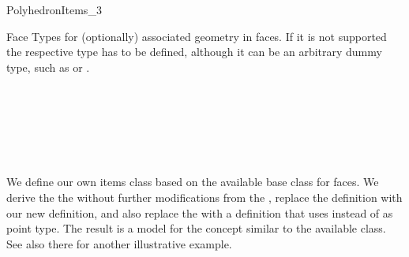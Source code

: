\begin{ccRefConcept}{PolyhedronItems_3}
\begin{ccClass}{Face}
Types for (optionally) associated geometry in faces. If it is not
supported the respective type has to be defined, although it can be
an arbitrary dummy type, such as  or .





\ccTagFullDeclarations
{}
         

\ccGlue
{}


%

\ccTagDefaults

\end{ccClass}

\ccHasModels


\ccSeeAlso

\\
\\
\\
\\
\\

\ccExample

We define our own items class based on the available
 base class for faces. We derive the
the  without further modifications from the
, replace the 
definition with our new definition, and also replace the
 with a definition that uses  instead
of  as point type. The result is a model for the
 concept similar to the available
 class. See also there for another
illustrative example.


\end{ccRefConcept}
